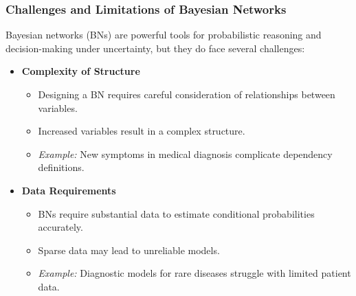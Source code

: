 \documentclass[aspectratio=169]{beamer}
\begin{document}
\begin{frame}[fragile]
    \frametitle{Challenges and Limitations of Bayesian Networks}
    
    Bayesian networks (BNs) are powerful tools for probabilistic reasoning and decision-making under uncertainty, but they do face several challenges:
    
    \begin{itemize}
        \item \textbf{Complexity of Structure}
        \begin{itemize}
            \item Designing a BN requires careful consideration of relationships between variables.
            \item Increased variables result in a complex structure.
            \item \emph{Example:} New symptoms in medical diagnosis complicate dependency definitions.
        \end{itemize}
        
        \item \textbf{Data Requirements}
        \begin{itemize}
            \item BNs require substantial data to estimate conditional probabilities accurately.
            \item Sparse data may lead to unreliable models.
            \item \emph{Example:} Diagnostic models for rare diseases struggle with limited patient data.
        \end{itemize}
    \end{itemize}
\end{frame}
\end{document}
